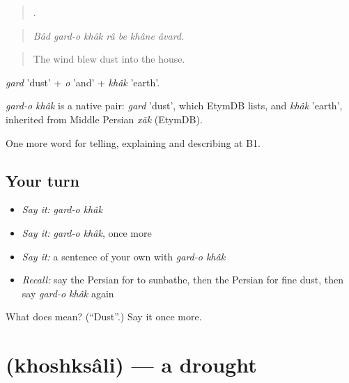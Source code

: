 \begin{quote}
       .
\end{quote}

\begin{quote}
\emph{Bâd gard-o khâk râ be khâne âvard.}
\end{quote}

\begin{quote}
The wind blew dust into the house.
\end{quote}

\emph{gard} 'dust' + \emph{o} 'and' + \emph{khâk} 'earth'.

\begin{cousinweb}
\emph{gard-o khâk} is a native pair: \emph{gard} 'dust', which EtymDB lists, and \emph{khâk} 'earth', inherited from Middle Persian \emph{xāk} (EtymDB).
\end{cousinweb}

\begin{grammarlens}[title={What you've built}]
One more word for telling, explaining and describing at B1.
\end{grammarlens}

\subsection*{Your turn}
\begin{itemize}
\raggedright
  \item \emph{Say it:} \emph{gard-o khâk}
  \item \emph{Say it:} \emph{gard-o khâk}, once more
  \item \emph{Say it:} a sentence of your own with \emph{gard-o khâk}
  \item \emph{Recall:} say the Persian for to sunbathe, then the Persian for fine dust, then say \emph{gard-o khâk} again
\end{itemize}

\begin{tcolorbox}[breakable,colback=teal!4,colframe=teal!35!black,title={Before you move on}]
What does    mean? (\textquotedblleft{}Dust\textquotedblright{}.) Say it once more.
\end{tcolorbox}
\section[\texorpdfstring{\fa{خشکسالی} (khoshksâli)}{خشکسالی (khoshksâli)}]{ (khoshksâli) — a drought}

